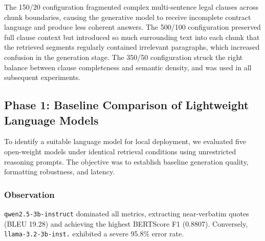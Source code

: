 \documentclass[conference]{IEEEtran}
\begin{document}
The 150/20 configuration fragmented complex multi-sentence legal clauses across chunk boundaries, causing the generative model to receive incomplete contract language and produce less coherent answers. The 500/100 configuration preserved full clause context but introduced so much surrounding text into each chunk that the retrieved segments regularly contained irrelevant paragraphs, which increased confusion in the generation stage. The 350/50 configuration struck the right balance between clause completeness and semantic density, and was used in all subsequent experiments.

\subsection{Phase 1: Baseline Comparison of Lightweight Language Models}
\label{sec:phase1}

To identify a suitable language model for local deployment, we evaluated five open-weight models under identical retrieval conditions using unrestricted reasoning prompts. The objective was to establish baseline generation quality, formatting robustness, and latency.

\begin{table}[!t]
\centering
\caption{Phase 1: Baseline Model Comparison (Unrestricted Reasoning)}
\label{tab:phase1}
\renewcommand{\arraystretch}{1.2}
\end{table}

\subsubsection*{Observation}
\texttt{qwen2.5-3b-instruct} dominated all metrics, extracting near-verbatim quotes (BLEU 19.28) and achieving the highest BERTScore F1 (0.8807). Conversely, \texttt{llama-3.2-3b-inst.} exhibited a severe 95.8\% error rate.
\end{document}
